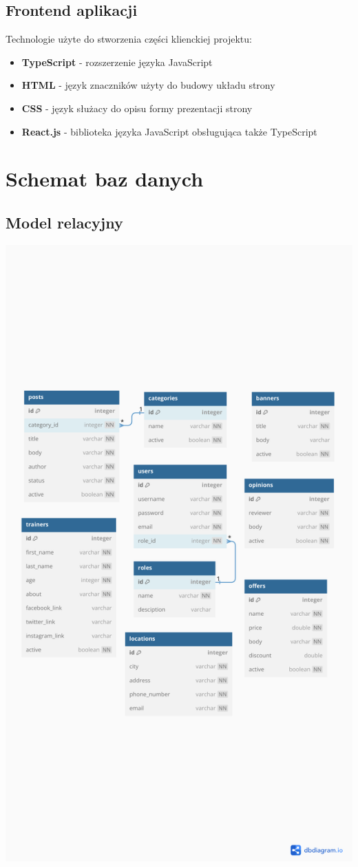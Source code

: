 \documentclass[12pt]{article}
\begin{document}
\subsection{Frontend aplikacji}
Technologie użyte do stworzenia części klienckiej projektu:
\begin{itemize}
\item \textbf{TypeScript} - rozszerzenie języka JavaScript
\item \textbf{HTML} - język znaczników użyty do budowy układu strony
\item \textbf{CSS} - język służacy do opisu formy prezentacji strony
\item \textbf{React.js} - biblioteka języka JavaScript obsługująca także TypeScript
\end{itemize}
\newpage
\section{Schemat baz danych}
\subsection{Model relacyjny}
\includegraphics[width=1\textwidth, angle=0]{images/Relational.pdf}
\newpage
\end{document}
